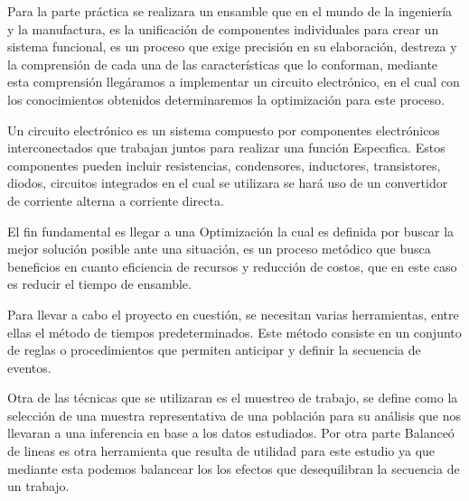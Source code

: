     Para la parte práctica se realizara un ensamble que en el mundo de la ingeniería y la manufactura, es la unificación de componentes individuales para crear un sistema funcional, es un proceso que exige precisión en su elaboración, destreza y la comprensión de cada una de las características que lo conforman, mediante esta comprensión llegáramos a implementar un circuito electrónico, en el cual con los conocimientos obtenidos determinaremos la optimización para este proceso. \cite{Ensamble}
    
    Un circuito electrónico es un sistema compuesto por componentes electrónicos interconectados que trabajan juntos para realizar una función Especıfica. Estos componentes pueden incluir resistencias, condensores, inductores, transistores, diodos, circuitos integrados en el cual se utilizara se hará uso de un convertidor de corriente alterna a corriente directa. \cite{Circuito}
    
    El fin fundamental es llegar a una Optimización la cual es definida por buscar la mejor solución posible ante una situación, es un proceso metódico que busca beneficios en cuanto eficiencia de recursos y reducción de costos, que en este caso es reducir el tiempo de ensamble.\cite{Optimización}
    
    Para llevar a cabo el proyecto en cuestión, se necesitan varias herramientas, entre ellas el método de tiempos predeterminados. Este método consiste en un conjunto de reglas o procedimientos que permiten anticipar y definir la secuencia de eventos.
    
    Otra de las técnicas que se utilizaran es el muestreo de trabajo, se define como la selección de una muestra representativa de una población para su análisis que nos llevaran a una inferencia en base a los datos estudiados. Por otra parte Balanceó de lineas es otra herramienta que resulta de utilidad para este estudio ya que mediante esta podemos balancear los los efectos que desequilibran la secuencia de un trabajo.
    
    
